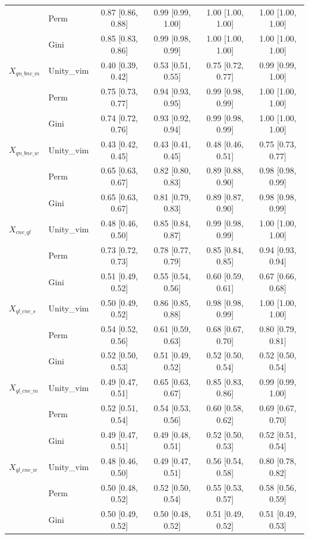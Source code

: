 \begin{tabular}{llcccc}
 & Perm & 0.87 [0.86, 0.88] & 0.99 [0.99, 1.00] & 1.00 [1.00, 1.00] & 1.00 [1.00, 1.00]\\
 & Gini & 0.85 [0.83, 0.86] & 0.99 [0.98, 0.99] & 1.00 [1.00, 1.00] & 1.00 [1.00, 1.00]\\
$X_{qn\_bne\_m}$ & Unity\_vim & 0.40 [0.39, 0.42] & 0.53 [0.51, 0.55] & 0.75 [0.72, 0.77] & 0.99 [0.99, 1.00]\\
 & Perm & 0.75 [0.73, 0.77] & 0.94 [0.93, 0.95] & 0.99 [0.98, 0.99] & 1.00 [1.00, 1.00]\\
 & Gini & 0.74 [0.72, 0.76] & 0.93 [0.92, 0.94] & 0.99 [0.98, 0.99] & 1.00 [1.00, 1.00]\\
$X_{qn\_bne\_w}$ & Unity\_vim & 0.43 [0.42, 0.45] & 0.43 [0.41, 0.45] & 0.48 [0.46, 0.51] & 0.75 [0.73, 0.77]\\
 & Perm & 0.65 [0.63, 0.67] & 0.82 [0.80, 0.83] & 0.89 [0.88, 0.90] & 0.98 [0.98, 0.99]\\
 & Gini & 0.65 [0.63, 0.67] & 0.81 [0.79, 0.83] & 0.89 [0.87, 0.90] & 0.98 [0.98, 0.99]\\
$X_{cne\_ql}$ & Unity\_vim & 0.48 [0.46, 0.50] & 0.85 [0.84, 0.87] & 0.99 [0.98, 0.99] & 1.00 [1.00, 1.00]\\
 & Perm & 0.73 [0.72, 0.73] & 0.78 [0.77, 0.79] & 0.85 [0.84, 0.85] & 0.94 [0.93, 0.94]\\
 & Gini & 0.51 [0.49, 0.52] & 0.55 [0.54, 0.56] & 0.60 [0.59, 0.61] & 0.67 [0.66, 0.68]\\
$X_{ql\_cne\_s}$ & Unity\_vim & 0.50 [0.49, 0.52] & 0.86 [0.85, 0.88] & 0.98 [0.98, 0.99] & 1.00 [1.00, 1.00]\\
 & Perm & 0.54 [0.52, 0.56] & 0.61 [0.59, 0.63] & 0.68 [0.67, 0.70] & 0.80 [0.79, 0.81]\\
 & Gini & 0.52 [0.50, 0.53] & 0.51 [0.49, 0.52] & 0.52 [0.50, 0.54] & 0.52 [0.50, 0.54]\\
$X_{ql\_cne\_m}$ & Unity\_vim & 0.49 [0.47, 0.51] & 0.65 [0.63, 0.67] & 0.85 [0.83, 0.86] & 0.99 [0.99, 1.00]\\
 & Perm & 0.52 [0.51, 0.54] & 0.54 [0.53, 0.56] & 0.60 [0.58, 0.62] & 0.69 [0.67, 0.70]\\
 & Gini & 0.49 [0.47, 0.51] & 0.49 [0.48, 0.51] & 0.52 [0.50, 0.53] & 0.52 [0.51, 0.54]\\
$X_{ql\_cne\_w}$ & Unity\_vim & 0.48 [0.46, 0.50] & 0.49 [0.47, 0.51] & 0.56 [0.54, 0.58] & 0.80 [0.78, 0.82]\\
 & Perm & 0.50 [0.48, 0.52] & 0.52 [0.50, 0.54] & 0.55 [0.53, 0.57] & 0.58 [0.56, 0.59]\\
 & Gini & 0.50 [0.49, 0.52] & 0.50 [0.48, 0.52] & 0.51 [0.49, 0.52] & 0.51 [0.49, 0.53]\\
\bottomrule
\end{tabular}
